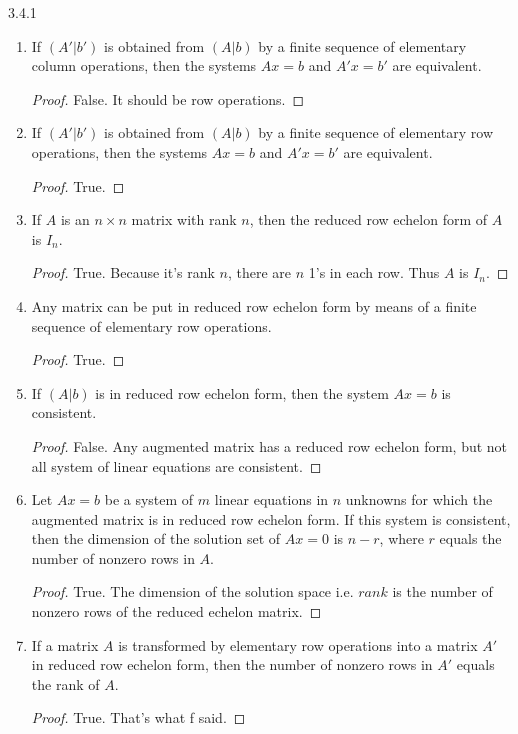 \documentclass[12pt, a4paper]{article}
\theoremstyle{plain}
\begin{document}
\begin{exercise}{3.4.1}
\hfill
	\begin{enumerate}[label=(\alph*)]
	\item If $(A'|b')$ is obtained from $(A|b)$ by a finite sequence of elementary column operations, then the systems $Ax=b$ and $A'x=b'$ are equivalent.
		\begin{proof}
		False. It should be row operations.
		\end{proof}
	\item If $(A'|b')$ is obtained from $(A|b)$ by a finite sequence of elementary row operations, then the systems $Ax=b$ and $A'x=b'$ are equivalent.
		\begin{proof}
		True.
		\end{proof}
	\item If $A$ is an $n\times n$ matrix with rank $n$, then the reduced row echelon form of $A$ is $I_n$.
		\begin{proof}
		True. Because it's rank $n$, there are $n$ 1's in each row. Thus $A$ is $I_n$.
		\end{proof}
	\item Any matrix can be put in reduced row echelon form by means of a finite sequence of elementary row operations.
		\begin{proof}
		True.
		\end{proof}
	\item If $(A|b)$ is in reduced row echelon form, then the system $Ax=b$ is consistent.
		\begin{proof}
		False. Any augmented matrix has a reduced row echelon form, but not all system of linear equations are consistent.
		\end{proof}
	\item Let $Ax=b$ be a system of $m$ linear equations in $n$ unknowns for which the augmented matrix is in reduced row echelon form. If this system is consistent, then the dimension of the solution set of $Ax=0$ is $n-r$, where $r$ equals the number of nonzero rows in $A$.
		\begin{proof}
		True. The dimension of the solution space i.e. $rank$ is the number of nonzero rows of the reduced echelon matrix.
		\end{proof}
	\item If a matrix $A$ is transformed by elementary row operations into a matrix $A'$ in reduced row echelon form, then the number of nonzero rows in $A'$ equals the rank of $A$.
		\begin{proof}
		True. That's what f said.
		\end{proof}
	\end{enumerate}
\end{exercise}
\end{document}
